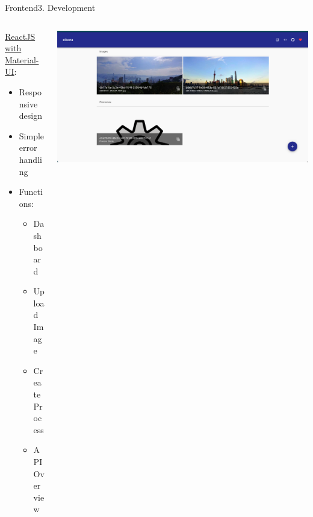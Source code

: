 \documentclass[aspectratio=169,20pt]{beamer}
\begin{document}
\begin{frame}{Frontend}{3. Development}
	\begin{columns}[onlytextwidth,T]
		\begin{column}{.40\linewidth}
			\underline{ReactJS with Material-UI}:
			\vspace{1in}
			\begin{itemize}
				\item{Responsive design}
				\item{Simple error handling}
				\item{Functions:}
				\begin{itemize}
					\item{Dashboard}
					\item{Upload Image}
					\item{Create Process}
					\item{API Overview}
				\end{itemize}
			\end{itemize}
		\end{column}	
		\begin{column}{.60\linewidth}
			\includegraphics[scale=0.35]{frontend}
		\end{column}
	\end{columns}
\end{frame}
\end{document}
